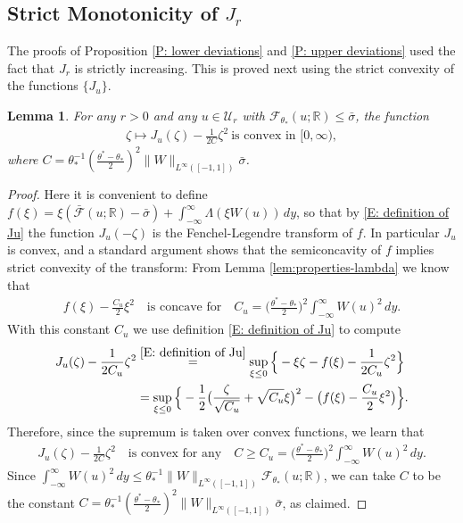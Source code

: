 \documentclass[10pt,a4paper]{amsart}
\newtheorem{lemma}{Lemma}
\begin{document}
\subsection{Strict Monotonicity of $J_{r}$} The proofs of Proposition \ref{P: lower deviations} and \ref{P: upper deviations} used the fact that $J_{r}$ is strictly increasing.  This is proved next using the strict convexity of the functions $\{ J_{u} \}$.

	
	\begin{lemma} For any $r > 0$ and any $u \in \mathcal{U}_{r}$ with $\mathscr{F}_{\theta_{*}}(u;\mathbb{R}) \leq \bar{\sigma}$, the function
		\begin{gather} \label{eqn:convexity-ju}
			\zeta \mapsto J_{ u } ( \zeta ) - \frac{ 1 }{ 2 C } \zeta^2
		~ \text{is~convex~in~}[0,\infty),
		\end{gather}
	where $C = \theta_{*}^{-1} \left( \frac{ \theta^{*} - \theta_{*} }{ 2 } \right)^{2} \|W\|_{L^{\infty}([-1,1])} \bar{\sigma}$. \end{lemma}
	
		\begin{proof} Here it is convenient to define $ f ( \xi ) =  \xi ( \bar{\mathscr{F}}(u; \mathbb{R}) - \bar{\sigma}) + \int_{-\infty}^{\infty} \Lambda ( \xi W(u) ) \, dy  $, so that by \eqref{E: definition of Ju} the function $ J_{ u } ( - \zeta ) $ is the Fenchel-Legendre transform of $ f $. In particular $ J_{ u } $ is convex, and a standard argument shows that the semiconcavity of $ f $ implies strict convexity of the transform: From Lemma \ref{lem:properties-lambda} we know that
		\begin{align*}
			f ( \xi ) - \frac{ C_{ u } }{ 2 } \xi^2
			\quad \text{is concave for} \quad
			C_{ u } = \Big( \frac{ \theta^* - \theta_* }{ 2 } \Big)^2 \int_{ - \infty }^{ \infty } W( u )^2  \, dy .
		\end{align*}
		With this constant $ C_{ u } $ we use definition \eqref{E: definition of Ju} to compute
		\begin{align*}
			J_{ u } ( \zeta ) - \frac{ 1 }{ 2  C_{ u } } \zeta^2 
			& \stackrel{ \eqref{E: definition of Ju} }{ = } \sup_{ \xi \leq 0 } \Big\{ - \xi \zeta - f ( \xi ) - \frac{ 1 }{ 2 C_{ u } } \zeta^2  \Big\} \\
			&=  \sup_{ \xi \leq 0 } \Big\{ - \frac{ 1 }{ 2 } \big( \frac{ \zeta }{ \sqrt{ C_{ u } } } + \sqrt{ C_{ u } } \xi \big)^2 - \big( f ( \xi ) - \frac{  C_{ u } }{ 2 } \xi^2 \big)  \Big\} .
		\end{align*}
		Therefore, since the supremum is taken over convex functions, we learn that
		\begin{align*}
			J_{ u } ( \zeta ) - \frac{ 1 }{ 2 C } \zeta^2 
			\quad \text{is convex for any} \quad 
			C \geq C_{ u } = \Big( \frac{ \theta^* - \theta_* }{ 2 } \Big)^2 \int_{ - \infty }^{ \infty } W( u )^2  \, dy .
		\end{align*}
		Since $\int_{-\infty}^{\infty} W(u)^{2} \, dy \leq \theta_{*}^{-1} \|W\|_{L^{\infty}([-1,1])} \mathscr{F}_{\theta_{*}}(u;\mathbb{R})$, we can take $C$ to be the constant $C = \theta_{*}^{-1} \left( \frac{ \theta^{*} - \theta_{*} }{ 2 } \right)^{2} \|W\|_{L^{\infty}([-1,1])} \bar{\sigma}$, as claimed.
	\end{proof}
		
\end{document}
